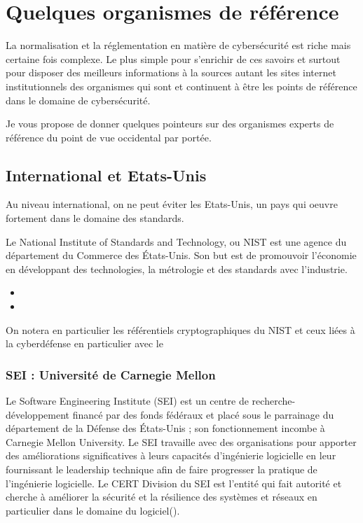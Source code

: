 \section{Quelques organismes de référence}

La normalisation et la réglementation en matière de cybersécurité est riche mais certaine fois complexe.
Le plus simple pour s'enrichir de ces savoirs et surtout pour disposer des meilleurs informations à la sources autant  les sites internet institutionnels des organismes qui sont et continuent à être les points de  référence dans le domaine de cybersécurité.

Je vous propose de donner quelques pointeurs sur des organismes experts  de référence du point de vue occidental par portée.

\subsection{International et Etats-Unis}

Au niveau international, on ne peut éviter les Etats-Unis, un pays qui oeuvre fortement dans le domaine des standards.

Le National Institute of Standards and Technology, ou NIST est une agence du département du Commerce des États-Unis. Son but est de promouvoir l'économie en développant des technologies, la métrologie et des standards avec l'industrie. 

\begin{itemize}
  \item {}
  \item {}
\end{itemize}

On notera en particulier les référentiels cryptographiques du NIST et ceux liées à la cyberdéfense en particulier avec le 

\subsubsection{SEI : Université de Carnegie Mellon}


Le Software Engineering Institute (SEI) est un centre de recherche-développement financé par des fonds fédéraux et placé sous le parrainage du département de la Défense des États-Unis ; son fonctionnement incombe à Carnegie Mellon University. Le SEI travaille avec des organisations pour apporter des améliorations significatives à leurs capacités d’ingénierie logicielle en leur fournissant le leadership technique afin de faire progresser la pratique de l’ingénierie logicielle. Le CERT Division du SEI est l’entité qui fait autorité et cherche à améliorer la sécurité et la résilience des systèmes et réseaux en particulier dans le domaine du logiciel().

